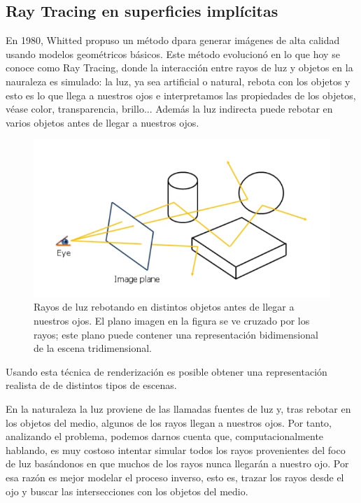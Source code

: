 \newpage
\subsection{Ray Tracing en superficies implícitas}

En 1980, Whitted\cite{Whitted80} propuso un método dpara generar imágenes de alta calidad usando modelos geométricos básicos. Este método evolucionó en lo que hoy se conoce como Ray Tracing, donde la interacción entre rayos de luz y objetos en la nauraleza es simulado: la luz, ya sea artificial o natural, rebota con los objetos y esto es lo que llega a nuestros ojos e interpretamos las propiedades de los objetos, véase color, transparencia, brillo... Además la luz indirecta puede rebotar en varios objetos antes de llegar a nuestros ojos.

\begin{figure}[h]
\centering
\includegraphics[scale=0.5]{images/florez1.png}
\caption{Rayos de luz rebotando en distintos objetos antes de llegar a nuestros ojos. El plano imagen en la figura se ve cruzado por los rayos; este plano puede contener una representación bidimensional de la escena tridimensional.}
\end{figure}

Usando esta técnica de renderización es posible obtener una representación realista de  de distintos tipos de escenas.
\par En la naturaleza la luz proviene de las llamadas fuentes de luz y, tras rebotar en los objetos del medio, algunos de los rayos llegan a nuestros ojos. Por tanto, analizando el problema, podemos darnos cuenta que, computacionalmente hablando, es muy costoso intentar simular todos los rayos provenientes del foco de luz basándonos en que muchos de los rayos nunca llegarán a nuestro ojo. Por esa razón  es mejor modelar el proceso inverso, esto es, trazar los rayos desde el ojo y buscar las intersecciones con  los objetos del medio.

